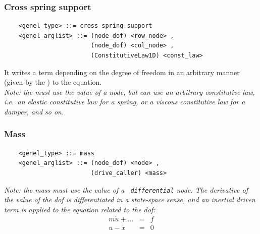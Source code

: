 \subsubsection{Cross spring support}
\label{sec:EL:GENEL:CROSS-SPRING-SUPPORT}
\begin{verbatim}
    <genel_type> ::= cross spring support
    <genel_arglist> ::= (node_dof) <row_node> ,                      
                        (node_dof) <col_node> ,                      
                        (ConstitutiveLaw1D) <const_law>
\end{verbatim}
It writes a term depending on the  degree of freedom in an
arbitrary manner (given by the ) to the 
 equation. \\
{\em
    Note: the  must use the  value
    of a  node, but can use an arbitrary constitutive law,
    i.e.\ an elastic constitutive law for a spring, or a viscous
    constitutive law for a damper, and so on.
}

\subsubsection{Mass}
\label{sec:EL:GENEL:MASS}
\begin{verbatim}
    <genel_type> ::= mass
    <genel_arglist> ::= (node_dof) <node> ,                     
                        (drive_caller) <mass>
\end{verbatim}
{\em
    Note: the mass must use the  value of a {\tt
    differential} node. The derivative of the  value of
    the dof is differentiated in a state-space sense, and an inertial driven
    term is applied to the equation related to the dof:
    \begin{eqnarray*}
        m\dot{u} + \ldots & = & f \\
	u - \dot{x} & = & 0
    \end{eqnarray*}
}

